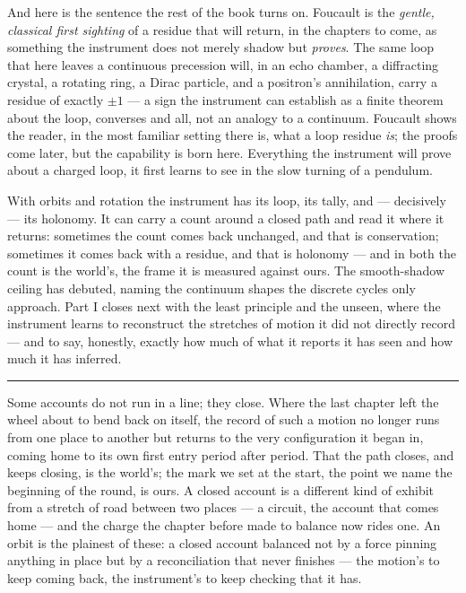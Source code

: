 And here is the sentence the rest of the book turns on. Foucault is the \emph{gentle, classical first
sighting} of a residue that will return, in the chapters to come, as something the instrument does not
merely shadow but \emph{proves}. The same loop that here leaves a continuous precession will, in an echo
chamber, a diffracting crystal, a rotating ring, a Dirac particle, and a positron's annihilation, carry a
residue of exactly $\pm 1$ --- a sign the instrument can establish as a finite theorem about the loop,
converses and all, not an analogy to a continuum. Foucault shows the reader, in the most familiar setting
there is, what a loop residue \emph{is}; the proofs come later, but the capability is born here. Everything
the instrument will prove about a charged loop, it first learns to see in the slow turning of a pendulum.

\bigskip

With orbits and rotation the instrument has its loop, its tally, and --- decisively --- its holonomy. It can
carry a count around a closed path and read it where it returns: sometimes the count comes back unchanged, and
that is conservation; sometimes it comes back with a residue, and that is holonomy --- and in both the count is
the world's, the frame it is measured against ours. The smooth-shadow ceiling
has debuted, naming the continuum shapes the discrete cycles only approach. Part I closes next with the least
principle and the unseen, where the instrument learns to reconstruct the stretches of motion it did not
directly record --- and to say, honestly, exactly how much of what it reports it has seen and how much it has
inferred.

\bigskip
\begin{center}
\rule{0.4\textwidth}{0.4pt}
\end{center}
\bigskip

\noindent Some accounts do not run in a line; they close. Where the last chapter left the wheel about to bend
back on itself, the record of such a motion no longer runs from one place to another but returns to the very
configuration it began in, coming home to its own first entry period after period. That the path closes, and
keeps closing, is the world's; the mark we set at the start, the point we name the beginning of the round, is
ours. A closed account is a different kind of exhibit from a stretch of road between two places --- a circuit,
the account that comes home --- and the charge the chapter before made to balance now rides one. An orbit is
the plainest of these: a closed account balanced not by a force pinning anything in place but by a
reconciliation that never finishes --- the motion's to keep coming back, the instrument's to keep checking that
it has.

